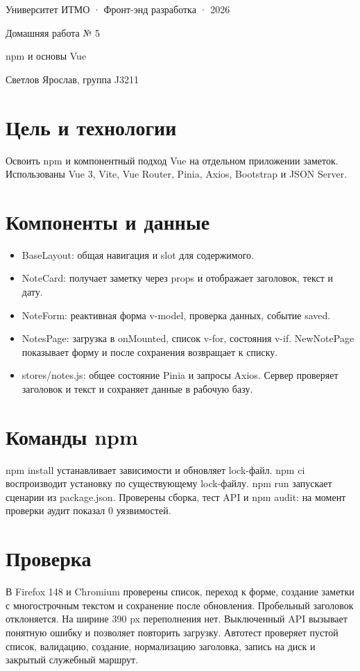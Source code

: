 \documentclass[11pt,a4paper]{article}
\begin{document}
\begin{center}
{\small Университет ИТМО · Фронт-энд разработка · 2026}\par
{\LARGE Домашняя работа № 5}\par
{\large npm и основы Vue}\par
Светлов Ярослав, группа J3211
\end{center}
\section*{Цель и технологии}
Освоить npm и компонентный подход Vue на отдельном приложении заметок. Использованы Vue 3, Vite, Vue Router, Pinia, Axios, Bootstrap и JSON Server.
\section*{Компоненты и данные}
\begin{itemize}
\item BaseLayout: общая навигация и slot для содержимого.
\item NoteCard: получает заметку через props и отображает заголовок, текст и дату.
\item NoteForm: реактивная форма v-model, проверка данных, событие saved.
\item NotesPage: загрузка в onMounted, список v-for, состояния v-if. NewNotePage показывает форму и после сохранения возвращает к списку.
\item stores/notes.js: общее состояние Pinia и запросы Axios. Сервер проверяет заголовок и текст и сохраняет данные в рабочую базу.
\end{itemize}

\section*{Команды npm}
npm install устанавливает зависимости и обновляет lock-файл. npm ci воспроизводит установку по существующему lock-файлу. npm run запускает сценарии из package.json. Проверены сборка, тест API и npm audit: на момент проверки аудит показал 0 уязвимостей.
\section*{Проверка}
В Firefox 148 и Chromium проверены список, переход к форме, создание заметки с многострочным текстом и сохранение после обновления. Пробельный заголовок отклоняется. На ширине 390 px переполнения нет. Выключенный API вызывает понятную ошибку и позволяет повторить загрузку. Автотест проверяет пустой список, валидацию, создание, нормализацию заголовка, запись на диск и закрытый служебный маршрут.
\end{document}
